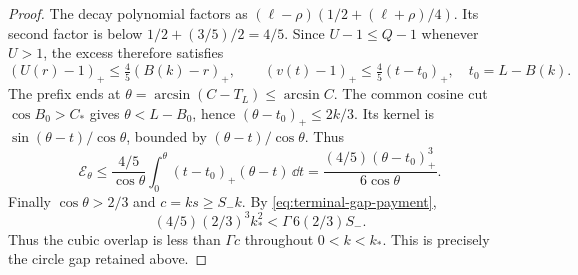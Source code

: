 \begin{proof}
The decay polynomial factors as
$(\ell-\rho)(1/2+(\ell+\rho)/4)$.
Its second factor is below $1/2+(3/5)/2=4/5$.
Since $U-1\le Q-1$ whenever $U>1$, the excess therefore satisfies
\[
 (U(r)-1)_+\le\tfrac45(B( k)-r)_+,\qquad
 (v(t)-1)_+\le\tfrac45(t-t_0)_+,\quad t_0=L-B( k).
\]
The prefix ends at $\theta=\arcsin(C-T_L)\le\arcsin C$.
The common cosine cut $\cos B_0>C_*$ gives
$\theta<L-B_0$, hence $(\theta-t_0)_+\le2 k/3$.
Its kernel is $\sin(\theta-t)/\cos\theta$, bounded by
$(\theta-t)/\cos\theta$. Thus
\begin{equation}\label{eq:partial-duration-moment}
 \mathcal E_\theta
 \le\frac{4/5}{\cos\theta}\int_0^\theta(t-t_0)_+(\theta-t)\,\dd t
 =\frac{(4/5)(\theta-t_0)_+^3}{6\cos\theta}.
\end{equation}
Finally $\cos\theta>2/3$ and $c= k s\ge S_- k$.
By \eqref{eq:terminal-gap-payment},
\[
 (4/5)(2/3)^3k_*^2<\Gamma\,6(2/3)S_-.
\]
Thus the cubic overlap is less than $\Gamma c$ throughout
$0<k<k_*$. This is precisely the circle gap retained above.
\end{proof}
